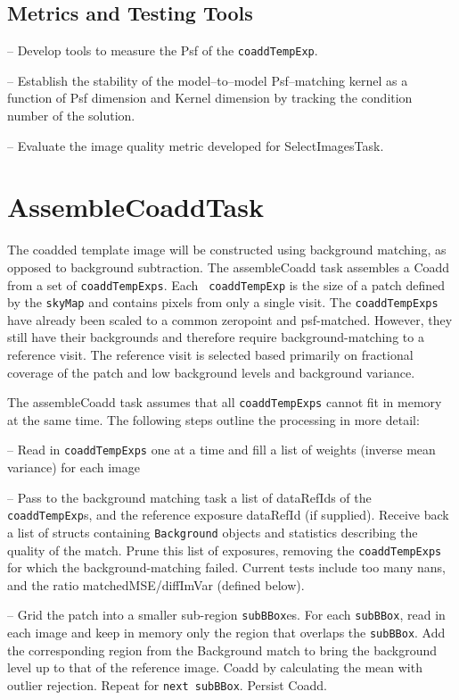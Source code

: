 \documentclass[prd, nofootinbib, floatfix, 11pt,tightenlines,times]{article}
\begin{document}
\subsection{Metrics and Testing Tools}

-- Develop tools to measure the Psf of the {\tt coaddTempExp}.

-- Establish the stability of the model--to--model Psf--matching
kernel as a function of Psf dimension and Kernel dimension by tracking
the condition number of the solution.

-- Evaluate the image quality metric developed for SelectImagesTask.


\section{AssembleCoaddTask} 

The coadded template image will be constructed using background
matching, as opposed to background subtraction. The assembleCoadd task
assembles a Coadd from a set of {\tt coaddTempExps}.  Each {\tt
  coaddTempExp} is the size of a patch defined by the {\tt skyMap} and
contains pixels from only a single visit.  The {\tt coaddTempExps}
have already been scaled to a common zeropoint and psf-matched.
However, they still have their backgrounds and therefore require
background-matching to a reference visit. The reference visit is
selected based primarily on fractional coverage of the patch and low
background levels and background variance.

The assembleCoadd task assumes that all {\tt coaddTempExps} cannot fit
in memory at the same time. The following steps outline the processing
in more detail:

-- Read in {\tt coaddTempExps} one at a time and fill a list of
weights (inverse mean variance) for each image

-- Pass to the background matching task a list of dataRefIds of the
{\tt coaddTempExp}s, and the reference exposure dataRefId (if
supplied).  Receive back a list of structs containing {\tt Background}
objects and statistics describing the quality of the match.  Prune
this list of exposures, removing the {\tt coaddTempExps} for which the
background-matching failed.  Current tests include too many nans, and
the ratio matchedMSE/diffImVar (defined below).

-- Grid the patch into a smaller sub-region {\tt subBBox}es. For each
{\tt subBBox}, read in each image and keep in memory only the region
that overlaps the {\tt subBBox}. Add the corresponding region from the
Background match to bring the background level up to that of the
reference image.  Coadd by calculating the mean with outlier
rejection.  Repeat for {\tt next subBBox}.  Persist Coadd.
\end{document}
